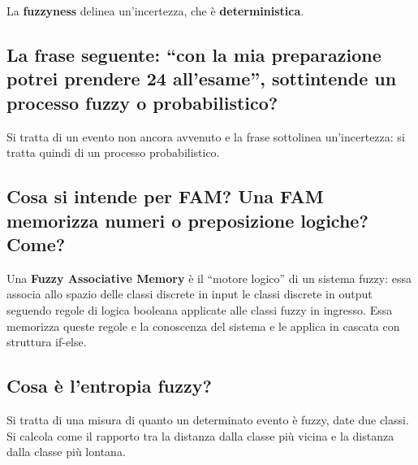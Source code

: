 \documentclass[\main/main.tex]{subfiles}
\begin{document}
La \textbf{fuzzyness} delinea un'incertezza, che è \textbf{deterministica}.

\subsection{La frase seguente: “con la mia preparazione potrei prendere 24 all'esame”, sottintende un processo fuzzy o probabilistico?}
Si tratta di un evento non ancora avvenuto e la frase sottolinea un'incertezza: si tratta quindi di un processo probabilistico.

\subsection{Cosa si intende per FAM? Una FAM memorizza numeri o preposizione logiche? Come?}
Una \textbf{Fuzzy Associative Memory} è il ``motore logico'' di un sistema fuzzy: essa associa allo spazio delle classi discrete in input le classi discrete in output seguendo regole di logica booleana applicate alle classi fuzzy in ingresso. Essa memorizza queste regole e la conoscenza del sistema e le applica in cascata con struttura if-else.

\subsection{Cosa è l'entropia fuzzy?}
Si tratta di una misura di quanto un determinato evento è fuzzy, date due classi. Si calcola come il rapporto tra la distanza dalla classe più vicina e la distanza dalla classe più lontana.


\end{document}
